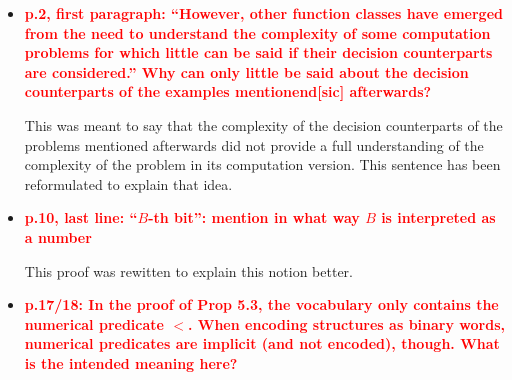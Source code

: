 \documentclass[a4paper]{article}
\newcommand{\red}[1]{{\bf\textcolor{red}{#1}}}
\begin{document}
\begin{itemize}
	\setlength\itemsep{0.5em}
	\item \red{p.2, first paragraph: ``However, other function classes have emerged from the need to understand	the complexity of some computation problems for which little can be said if their decision counterparts are considered.'' Why can only little be said about the decision counterparts of the examples mentionend[sic] afterwards?}
	
	This was meant to say that the complexity of the decision counterparts of the problems mentioned afterwards did not provide a full understanding of the complexity of the problem in its computation version. This sentence has been reformulated to explain that idea.
	
	\item \red{p.10, last line: ``$B$-th bit'': mention in what way $B$ is interpreted as a number}
	
	This proof was rewitten to explain this notion better.
	
	\item \red{p.17/18: In the proof of Prop 5.3, the vocabulary only contains the numerical predicate $<$. When encoding structures as binary words, numerical predicates are implicit (and not encoded), though. What is the intended meaning here?}
	

\end{itemize}
\end{document}
